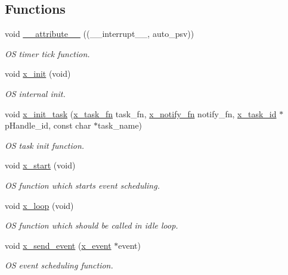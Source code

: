 \subsection*{Functions}
\begin{DoxyCompactItemize}
\item 
void \hyperlink{a00037_a2068c3c2584547dbc1c8b9bca2d55b18}{\+\_\+\+\_\+attribute\+\_\+\+\_\+} ((\+\_\+\+\_\+interrupt\+\_\+\+\_\+, auto\+\_\+psv))
\begin{DoxyCompactList}\small\item\em O\+S timer tick function. \end{DoxyCompactList}\item 
void \hyperlink{a00037_a05f27d3148e368ee84a448f3c4b083dd}{x\+\_\+init} (void)
\begin{DoxyCompactList}\small\item\em O\+S internal init. \end{DoxyCompactList}\item 
void \hyperlink{a00037_a1e79db5ed3ab326586129eb4d7b63d46}{x\+\_\+init\+\_\+task} (\hyperlink{a00036_ace830f248538d21bb16ea9c00997fcd7}{x\+\_\+task\+\_\+fn} task\+\_\+fn, \hyperlink{a00036_a29c1adcba84e0c3e83657c91e9b2b764}{x\+\_\+notify\+\_\+fn} notify\+\_\+fn, \hyperlink{a00036_ad5c3c5fbfd3e4aadf22830395484a71d}{x\+\_\+task\+\_\+id} $\ast$p\+Handle\+\_\+id, const char $\ast$task\+\_\+name)
\begin{DoxyCompactList}\small\item\em O\+S task init function. \end{DoxyCompactList}\item 
void \hyperlink{a00037_aea907663ecaf77bacfb9f0bfdc11f900}{x\+\_\+start} (void)
\begin{DoxyCompactList}\small\item\em O\+S function which starts event scheduling. \end{DoxyCompactList}\item 
void \hyperlink{a00037_a4bb7a012be733e061c913e7b98df642b}{x\+\_\+loop} (void)
\begin{DoxyCompactList}\small\item\em O\+S function which should be called in idle loop. \end{DoxyCompactList}\item 
void \hyperlink{a00037_a4bc3d03c8d62c8237329ed4e969fbc1b}{x\+\_\+send\+\_\+event} (\hyperlink{a00036_de/d37/a00849}{x\+\_\+event} $\ast$event)
\begin{DoxyCompactList}\small\item\em O\+S event scheduling function. \end{DoxyCompactList}\item 

\end{DoxyCompactItemize}
